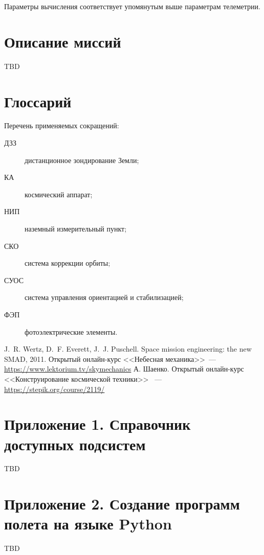 \documentclass[12pt,a4paper]{article}
\begin{document}
Параметры вычисления соответствует упомянутым выше параметрам телеметрии.

\section{Описание миссий}
\label{Sec:Missions}

TBD

\section{Глоссарий}

Перечень применяемых сокращений:

\begin{description}
  \item[ДЗЗ] дистанционное зондирование Земли;
  \item[КА] космический аппарат;
  \item[НИП] наземный измерительный пункт;
  \item[СКО] система коррекции орбиты;
  \item[СУОС] система управления ориентацией и стабилизацией;
  \item[ФЭП] фотоэлектрические элементы.
\end{description}

\begin{thebibliography}{2}
 J.~R. Wertz, D.~F. Everett, J.~J. Puschell. Space mission
engineering: the new SMAD, 2011.
 Открытый онлайн-курс <<Небесная механика>>~---
  \url{https://www.lektorium.tv/skymechanics}
 А. Шаенко. Открытый онлайн-курс <<Конструирование космической техники>> ~---
  \url{https://stepik.org/course/2119/}
\end{thebibliography}

\section*{Приложение 1. Справочник доступных подсистем}
\label{Sec:Subsystems}

TBD

\section*{Приложение 2. Создание программ полета на языке Python}
\label{Sec:Python}

TBD
\end{document}
